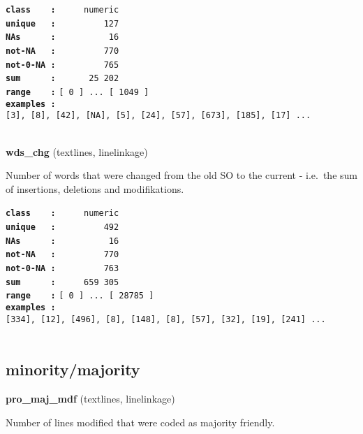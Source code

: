 \documentclass[]{article}
\begin{document}
\textbf{\texttt{class\ \ \ \ :}} \texttt{~~~~~numeric}\\
\textbf{\texttt{unique\ \ \ :}} \texttt{~~~~~~~~~127}\\
\textbf{\texttt{NAs\ \ \ \ \ \ :}} \texttt{~~~~~~~~~~16}\\
\textbf{\texttt{not-NA\ \ \ :}} \texttt{~~~~~~~~~770}\\
\textbf{\texttt{not-0-NA\ :}} \texttt{~~~~~~~~~765}\\
\textbf{\texttt{sum\ \ \ \ \ \ :}} \texttt{~~~~~~25~202}\\
\textbf{\texttt{range\ \ \ \ :}}
\texttt{{[}\ 0\ {]}\ ...\ {[}\ 1049\ {]}}\\
\textbf{\texttt{examples\ :}}
\texttt{{[}3{]},\ {[}8{]},\ {[}42{]},\ {[}NA{]},\ {[}5{]},\ {[}24{]},\ {[}57{]},\ {[}673{]},\ {[}185{]},\ {[}17{]}\ ...}\\

~

\textbf{wds\_chg} (textlines, linelinkage)

Number of words that were changed from the old SO to the current -
i.e.~the sum of insertions, deletions and modifikations.

\textbf{\texttt{class\ \ \ \ :}} \texttt{~~~~~numeric}\\
\textbf{\texttt{unique\ \ \ :}} \texttt{~~~~~~~~~492}\\
\textbf{\texttt{NAs\ \ \ \ \ \ :}} \texttt{~~~~~~~~~~16}\\
\textbf{\texttt{not-NA\ \ \ :}} \texttt{~~~~~~~~~770}\\
\textbf{\texttt{not-0-NA\ :}} \texttt{~~~~~~~~~763}\\
\textbf{\texttt{sum\ \ \ \ \ \ :}} \texttt{~~~~~659~305}\\
\textbf{\texttt{range\ \ \ \ :}}
\texttt{{[}\ 0\ {]}\ ...\ {[}\ 28785\ {]}}\\
\textbf{\texttt{examples\ :}}
\texttt{{[}334{]},\ {[}12{]},\ {[}496{]},\ {[}8{]},\ {[}148{]},\ {[}8{]},\ {[}57{]},\ {[}32{]},\ {[}19{]},\ {[}241{]}\ ...}\\

~

\subsection{minority/majority}\label{minoritymajority}

\textbf{pro\_maj\_mdf} (textlines, linelinkage)

Number of lines modified that were coded as majority friendly.
\end{document}

